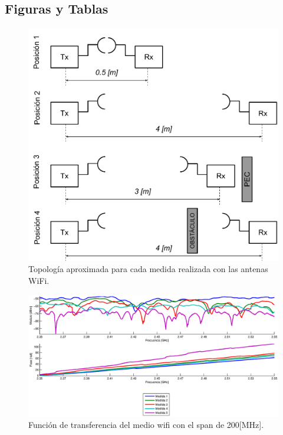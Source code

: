 \documentclass[10pt,conference,a4paper]{IEEEtran}
\begin{document}
\subsection{Figuras y Tablas}
\begin{figure}[htb]
    \centering
    \includegraphics[width=\columnwidth]{figuras/posicion_antenas_wifi.pdf}
    \caption{Topología aproximada para cada medida realizada con las antenas WiFi.}
    \label{fig:posiciones_wifi}
\end{figure}
\begin{figure}[htb]
    \centering
    \includegraphics[width=\columnwidth]{figuras/funcion_transferencia_wifi.eps}
    \caption{Función de transferencia del medio wifi con el span de 200[MHz].}
    \label{fig:transferencia_wifi}
\end{figure}
\end{document}
